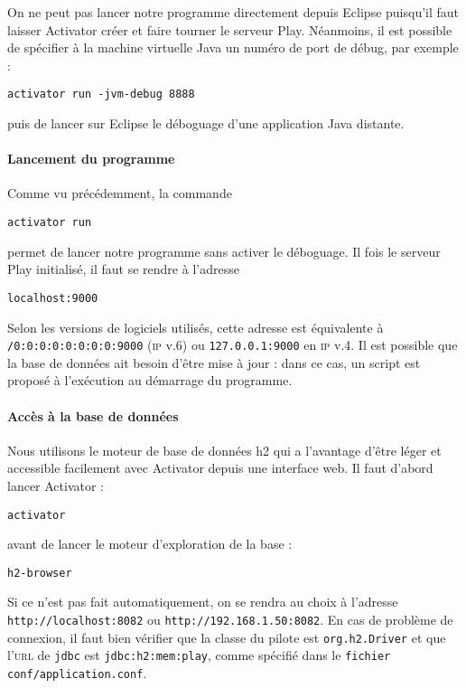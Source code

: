 \documentclass[11pt]{article}
\begin{document}
On ne peut pas lancer notre programme directement depuis Eclipse puisqu'il faut laisser Activator créer et faire tourner le serveur Play. Néanmoins, il est possible de spécifier à la machine virtuelle Java un numéro de port de débug, par exemple :
\begin{center}\texttt{activator run -jvm-debug 8888}\end{center} puis de lancer sur Eclipse le déboguage d'une application Java distante.

\paragraph{Lancement du programme}

Comme vu précédemment, la commande
\begin{center}\texttt{activator run}\end{center}
permet de lancer notre programme sans activer le déboguage. Il fois le serveur Play initialisé, il faut se rendre à l'adresse
\begin{center}\texttt{localhost:9000}\end{center}
Selon les versions de logiciels utilisés, cette adresse est équivalente à \texttt{/0:0:0:0:0:0:0:0:9000} (\textsc{ip} v.6) ou \texttt{127.0.0.1:9000} en \textsc{ip} v.4. Il est possible que la base de données ait besoin d'être mise à jour : dans ce cas, un script est proposé à l'exécution au démarrage du programme.

\paragraph{Accès à la base de données}

Nous utilisons le moteur de base de données h2 qui a l'avantage d'être léger et accessible facilement avec Activator depuis une interface web. Il faut d'abord lancer Activator :
\begin{center}\texttt{activator}\end{center}
avant de lancer le moteur d'exploration de la base :
\begin{center}\texttt{h2-browser}\end{center}
Si ce n'est pas fait automatiquement, on se rendra au choix à l'adresse \texttt{http://localhost:8082} ou \texttt{http://192.168.1.50:8082}. En cas de problème de connexion, il faut bien vérifier que la classe du pilote est \texttt{org.h2.Driver} et que l'\textsc{url} de \texttt{jdbc} est \texttt{jdbc:h2:mem:play}, comme spécifié dans le \texttt{fichier conf/application.conf}.
\end{document}
